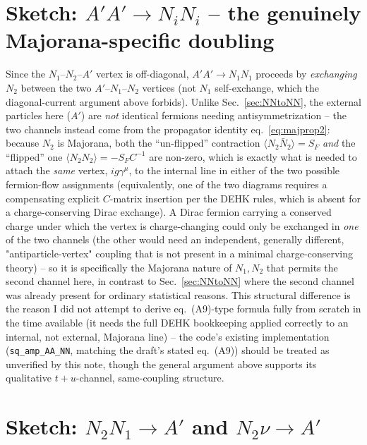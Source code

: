 \documentclass[11pt,a4paper]{article}
\newcommand{\code}[1]{\texttt{#1}}
\newcommand{\Ap}{A'}
\begin{document}
\section{Sketch: \texorpdfstring{$\Ap\Ap\to N_iN_i$}{A'A'->NiNi} -- the genuinely Majorana-specific doubling}
\label{sec:AAtoNN}

Since the $N_1$--$N_2$--$A'$ vertex is off-diagonal, $\Ap\Ap\to N_1N_1$
proceeds by \emph{exchanging $N_2$} between the two $A'$--$N_1$--$N_2$
vertices (not $N_1$ self-exchange, which the diagonal-current argument above
forbids). Unlike Sec.~\ref{sec:NNtoNN}, the external particles here ($A'$)
are \emph{not} identical fermions needing antisymmetrization -- the two
channels instead come from the propagator identity
eq.~\eqref{eq:majprop2}: because $N_2$ is Majorana, both the
``un-flipped'' contraction $\langle N_2\bar N_2\rangle=S_F$ \emph{and} the
``flipped'' one $\langle N_2N_2\rangle=-S_FC^{-1}$ are non-zero, which is
exactly what is needed to attach the \emph{same} vertex,
$ig\gamma^\mu$, to the internal line in either of the two possible
fermion-flow assignments (equivalently, one of the two diagrams requires a
compensating explicit $C$-matrix insertion per the DEHK rules, which is
absent for a charge-conserving Dirac exchange). A Dirac fermion carrying a
conserved charge under which the vertex is charge-changing could only be
exchanged in \emph{one} of the two channels (the other would need an
independent, generally different, "antiparticle-vertex" coupling that is not
present in a minimal charge-conserving theory) -- so it is specifically the
Majorana nature of $N_1,N_2$ that permits the second channel here, in
contrast to Sec.~\ref{sec:NNtoNN} where the second channel was already
present for ordinary statistical reasons. This structural difference is the
reason I did not attempt to derive eq.~(A9)-type formula fully from scratch
in the time available (it needs the full DEHK bookkeeping applied
correctly to an internal, not external, Majorana line) -- the code's
existing implementation (\code{sq\_amp\_AA\_NN}, matching the draft's stated
eq.~(A9)) should be treated as unverified by this note, though the general
argument above supports its qualitative $t+u$-channel, same-coupling
structure.

\section{Sketch: \texorpdfstring{$N_2N_1\to\Ap$}{N2N1->A'} and \texorpdfstring{$N_2\nu\to\Ap$}{N2nu->A'}}
\end{document}
